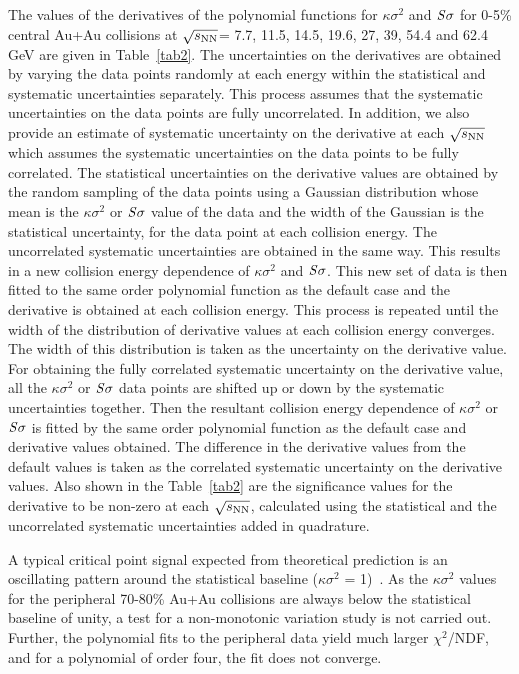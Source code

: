 \documentclass[10pt,aps,prc,twocolumn,floatfix]{revtex4-1}
\newcommand{\rootsnn} {\mbox{$\sqrt{s_{\rm NN}}$}\xspace}
\begin{document}
{The values of the derivatives of the polynomial functions for $\kappa\sigma^{2}$
and $\it{S}\sigma$ for 0-5\% central Au+Au collisions at \rootsnn = 7.7, 11.5, 14.5, 19.6, 27, 39, 54.4 and
62.4 GeV are given in Table~\ref{tab2}. The uncertainties on the
derivatives are obtained by varying the data
points randomly at each energy
within the statistical and systematic uncertainties separately. This
process assumes that the systematic uncertainties on the data points are fully
uncorrelated. In addition, we also provide an estimate of systematic
uncertainty on the derivative at each \rootsnn which assumes the
systematic uncertainties on the data points to be fully correlated. The statistical uncertainties on the
derivative values are obtained by the random sampling of the
data points using a Gaussian distribution whose mean is the
$\kappa\sigma^{2}$ or $\it{S}\sigma$ value of the data and the width of the
Gaussian is the statistical uncertainty, for
the data point at each collision energy. The uncorrelated systematic
uncertainties are obtained in the same way. This results in a new
collision energy dependence of $\kappa\sigma^{2}$ and
$\it{S}\sigma$. This new set of data is then fitted to the same order
polynomial function as the default case and the derivative is obtained at each collision
energy. This process is repeated until the width of the distribution of
derivative values at each collision energy converges. The width of this distribution is taken as
the uncertainty on the derivative value. 
For obtaining the fully correlated systematic uncertainty on the
derivative value, all the $\kappa\sigma^{2}$  or $\it{S}\sigma$ data
points are shifted up or down by the systematic uncertainties
together.  Then the resultant collision energy dependence of
$\kappa\sigma^{2}$ or $\it{S}\sigma$ is fitted by the same order polynomial
function as the default case and derivative values obtained. The difference in the
derivative values from the default values is taken as the correlated
systematic uncertainty on the derivative values. Also shown in the Table~\ref{tab2} are the significance
values for the derivative to be non-zero at each \rootsnn, calculated using the
statistical and the uncorrelated systematic uncertainties added in
quadrature.

A typical critical point signal expected from theoretical prediction is
an oscillating pattern around the statistical baseline
($\kappa\sigma^{2}$ = 1)~\cite{Stephanov:2011pb}.  As the
$\kappa\sigma^{2}$ values for the peripheral 70-80\% Au+Au collisions
are always below the statistical baseline of unity, a test for a non-monotonic
variation study is not carried out. Further, the polynomial fits to
the peripheral data yield much larger $\chi^{2}$/NDF,  and for a
polynomial of order four, the fit does not converge.

}
\end{document}
